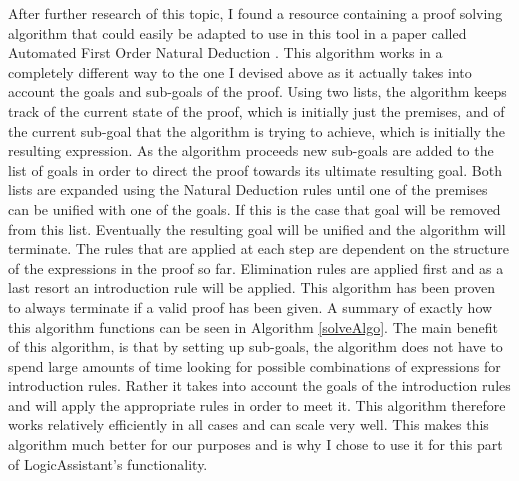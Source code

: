 After further research of this topic, I found a resource containing a proof solving algorithm that could easily be adapted to use in this tool in a paper called Automated First Order Natural Deduction \cite{ndAlgo}.  This algorithm works in a completely different way to the one I devised above as it actually takes into account the goals and sub-goals of the proof. Using two lists, the algorithm keeps track of the current state of the proof, which is initially just the premises, and of the current sub-goal that the algorithm is trying to achieve, which is initially the resulting expression. As the algorithm proceeds new sub-goals are added to the list of goals in order to direct the proof towards its ultimate resulting goal. Both lists are expanded using the Natural Deduction rules until one of the premises can be unified with one of the goals. If this is the case that goal will be removed from this list. Eventually the resulting goal will be unified and the algorithm will terminate. The rules that are applied at each step are dependent on the structure of the expressions in the proof so far. Elimination rules are applied first and as a last resort an introduction rule will be applied. This algorithm has been proven to always terminate if a valid proof has been given. A summary of exactly how this algorithm functions can be seen in Algorithm \ref{solveAlgo}. The main benefit of this algorithm, is that by setting up sub-goals, the algorithm does not have to spend large amounts of time looking for possible combinations of expressions for introduction rules. Rather it takes into account the goals of the introduction rules and will apply the appropriate rules in order to meet it. This algorithm therefore works relatively efficiently in all cases and can scale very well. This makes this algorithm much better for our purposes and is why I chose to use it for this part of LogicAssistant's functionality. 

